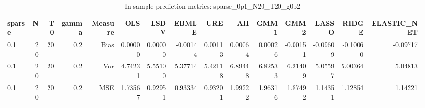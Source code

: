 \begin{table}[!htbp]\centering
\caption{In-sample prediction metrics: sparse_0p1_N20_T20_g0p2}
\label{tab:table2_sparse_0p1_N20_T20_g0p2}
\begin{tabular}{lrrrrrrrrrrrrrr}
\hline
sparse & N & T0 & gamma & Measure & OLS & LSDV & EBMLE & URE & AH & GMM1 & GMM2 & LASSO & RIDGE & ELASTIC_NET \\
\hline
0.1 & 20 & 20 & 0.2 & Bias & 0.00000 & 0.00000 & -0.00144 & 0.00113 & 0.00064 & 0.00026 & -0.00151 & -0.09609 & -0.10060 & -0.09717 \\
0.1 & 20 & 20 & 0.2 & Var & 4.74231 & 5.55100 & 5.37714 & 5.42118 & 6.89448 & 6.82533 & 6.21409 & 5.05597 & 5.00364 & 5.04813 \\
0.1 & 20 & 20 & 0.2 & MSE & 1.73567 & 0.92951 & 0.93334 & 0.93201 & 1.99222 & 1.96316 & 1.87492 & 1.14351 & 1.12854 & 1.14221 \\
\hline
\end{tabular}
\end{table}


